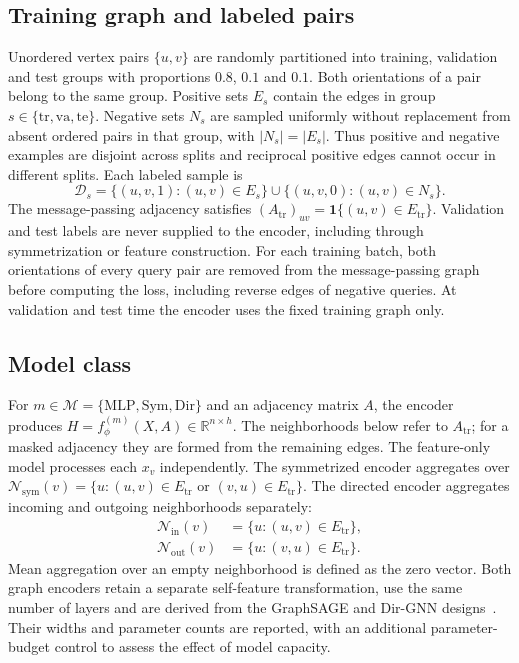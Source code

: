 \documentclass{article}
\begin{document}
\subsection{Training graph and labeled pairs}
Unordered vertex pairs $\{u,v\}$ are randomly partitioned into training, validation and test groups with proportions $0.8$, $0.1$ and $0.1$.
Both orientations of a pair belong to the same group.
Positive sets $E_s$ contain the edges in group $s\in\{\mathrm{tr},\mathrm{va},\mathrm{te}\}$.
Negative sets $N_s$ are sampled uniformly without replacement from absent ordered pairs in that group, with $|N_s|=|E_s|$.
Thus positive and negative examples are disjoint across splits and reciprocal positive edges cannot occur in different splits.
Each labeled sample is
\begin{equation}
\mathcal D_s=\{(u,v,1):(u,v)\in E_s\}
\cup\{(u,v,0):(u,v)\in N_s\}.
\end{equation}
The message-passing adjacency satisfies $(A_{\mathrm{tr}})_{uv}=\mathbf 1\{(u,v)\in E_{\mathrm{tr}}\}$.
Validation and test labels are never supplied to the encoder, including through symmetrization or feature construction.
For each training batch, both orientations of every query pair are removed from the message-passing graph before computing the loss, including reverse edges of negative queries.
At validation and test time the encoder uses the fixed training graph only.

\subsection{Model class}
For $m\in\mathcal M=\{\mathrm{MLP},\mathrm{Sym},\mathrm{Dir}\}$ and an adjacency matrix $A$, the encoder produces
$H=f^{(m)}_\phi(X,A)\in\mathbb R^{n\times h}$.
The neighborhoods below refer to $A_{\mathrm{tr}}$; for a masked adjacency they are formed from the remaining edges.
The feature-only model processes each $x_v$ independently.
The symmetrized encoder aggregates over
$\mathcal N_{\mathrm{sym}}(v)=\{u:(u,v)\in E_{\mathrm{tr}}\text{ or }(v,u)\in E_{\mathrm{tr}}\}$.
The directed encoder aggregates incoming and outgoing neighborhoods separately:
\begin{equation}
\begin{split}
\mathcal N_{\mathrm{in}}(v)&=\{u:(u,v)\in E_{\mathrm{tr}}\},\\
\mathcal N_{\mathrm{out}}(v)&=\{u:(v,u)\in E_{\mathrm{tr}}\}.
\end{split}
\end{equation}
Mean aggregation over an empty neighborhood is defined as the zero vector.
Both graph encoders retain a separate self-feature transformation, use the same number of layers and are derived from the GraphSAGE and Dir-GNN designs~\cite{sage,dirgnn}.
Their widths and parameter counts are reported, with an additional parameter-budget control to assess the effect of model capacity.
\end{document}

